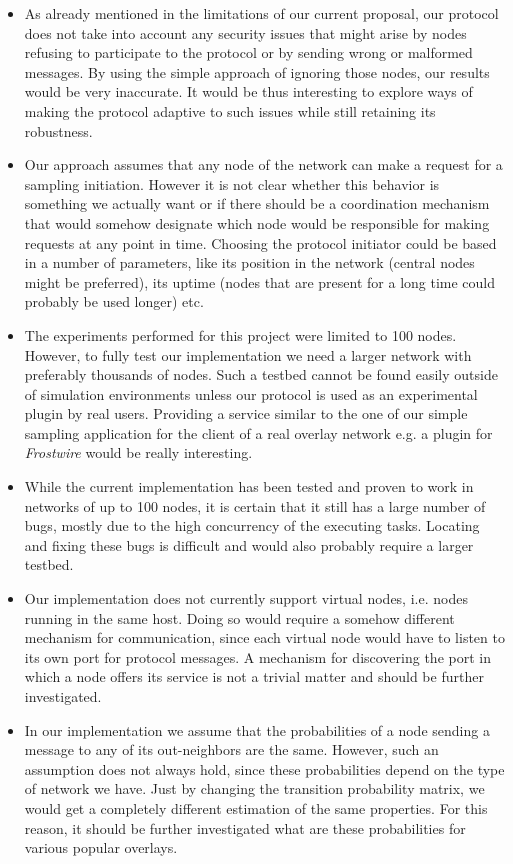 \documentclass[a4paper,11pt,twoside]{report}
\begin{document}
\begin{itemize}
\item As already mentioned in the limitations of our current proposal, our protocol does not take into account any security issues that might arise by nodes refusing to participate to the protocol or by sending wrong or malformed messages. By using the simple approach of ignoring those nodes, our results would be very inaccurate. It would be thus interesting to explore ways of making the protocol adaptive to such issues while still retaining its robustness.
\item Our approach assumes that any node of the network can make a request for a sampling initiation. However it is not clear whether this behavior is something we actually want or if there should be a coordination mechanism that would somehow designate which node would be responsible for making requests at any point in time. Choosing the protocol initiator could be based in a number of parameters, like its position in the network (central nodes might be preferred), its uptime (nodes that are present for a long time could probably be used longer) etc. 
\item The experiments performed for this project were limited to 100 nodes. However, to fully test our implementation we need a larger network with preferably thousands of nodes. Such a testbed cannot be found easily outside of simulation environments unless our protocol is used as an experimental plugin by real users. Providing a service similar to the one of our simple sampling application for the client of a real overlay network e.g. a plugin for \textit{Frostwire} would be really interesting.
\item While the current implementation has been tested and proven to work in networks of up to 100 nodes, it is certain that it still has a large number of bugs, mostly due to the high concurrency of the executing tasks. Locating and fixing these bugs is difficult and would also probably require a larger testbed.
\item Our implementation does not currently support virtual nodes, i.e. nodes running in the same host. Doing so would require a somehow different mechanism for communication, since each virtual node would have to listen to its own port for protocol messages. A mechanism for  discovering the port in which a node offers its service is not a trivial matter and should be further investigated.
\item In our implementation we assume that the probabilities of a node sending a message to any of its out-neighbors are the same. However, such an assumption does not always hold, since these probabilities depend on the type of network we have. Just by changing the transition probability matrix, we would get a completely different estimation of the same properties. For this reason, it should be further investigated what are these probabilities for various popular overlays.
\end{itemize} 
\end{document}
